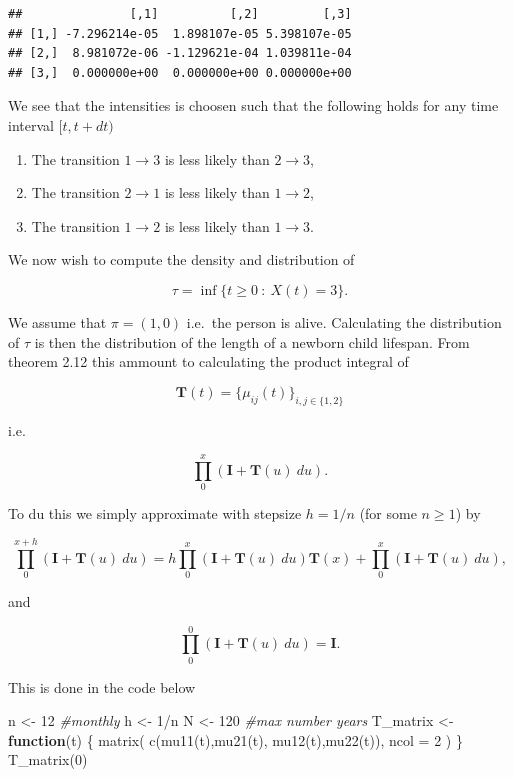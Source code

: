 \documentclass[
]{book}
\newenvironment{Shaded}{\begin{snugshade}}{\end{snugshade}}
\newcommand{\AttributeTok}[1]{\textcolor[rgb]{0.77,0.63,0.00}{#1}}
\newcommand{\CommentTok}[1]{\textcolor[rgb]{0.56,0.35,0.01}{\textit{#1}}}
\newcommand{\ControlFlowTok}[1]{\textcolor[rgb]{0.13,0.29,0.53}{\textbf{#1}}}
\newcommand{\DecValTok}[1]{\textcolor[rgb]{0.00,0.00,0.81}{#1}}
\newcommand{\FunctionTok}[1]{\textcolor[rgb]{0.00,0.00,0.00}{#1}}
\newcommand{\NormalTok}[1]{#1}
\newcommand{\OtherTok}[1]{\textcolor[rgb]{0.56,0.35,0.01}{#1}}
\newcommand{\SpecialCharTok}[1]{\textcolor[rgb]{0.00,0.00,0.00}{#1}}
\providecommand{\tightlist}{%
  \setlength{\itemsep}{0pt}\setlength{\parskip}{0pt}}
\begin{document}
\begin{verbatim}
##               [,1]          [,2]         [,3]
## [1,] -7.296214e-05  1.898107e-05 5.398107e-05
## [2,]  8.981072e-06 -1.129621e-04 1.039811e-04
## [3,]  0.000000e+00  0.000000e+00 0.000000e+00
\end{verbatim}

We see that the intensities is choosen such that the following holds for any time interval \([t,t+dt)\)

\begin{enumerate}
\def\labelenumi{\arabic{enumi}.}
\tightlist
\item
  The transition \(1\to 3\) is less likely than \(2\to 3\),
\item
  The transition \(2\to 1\) is less likely than \(1\to 2\),
\item
  The transition \(1\to 2\) is less likely than \(1\to 3\).
\end{enumerate}

We now wish to compute the density and distribution of

\[
\tau =\inf\{t\ge 0\ :\ X(t)=3\}.
\]

We assume that \(\pi=(1,0)\) i.e.~the person is alive. Calculating the distribution of \(\tau\) is then the distribution of the length of a newborn child lifespan. From theorem 2.12 this ammount to calculating the product integral of

\[
\mathbf{T}(t)=\{\mu_{ij}(t)\}_{i,j\in \{1,2\}}
\]

i.e.~

\[
\prod_0^x(\mathbf{I}+\mathbf{T}(u)\ du).
\]

To du this we simply approximate with stepsize \(h=1/n\) (for some \(n\ge 1\)) by

\[
\prod_0^{x+h}(\mathbf{I}+\mathbf{T}(u)\ du)=h\prod_0^x(\mathbf{I}+\mathbf{T}(u)\ du)\mathbf{T}(x)+\prod_0^x(\mathbf{I}+\mathbf{T}(u)\ du),
\]

and

\[
\prod_0^0(\mathbf{I}+\mathbf{T}(u)\ du)=\mathbf{I}.
\]

This is done in the code below

\begin{Shaded}
\begin{Highlighting}[]
\NormalTok{n }\OtherTok{\textless{}{-}} \DecValTok{12} \CommentTok{\#monthly}
\NormalTok{h }\OtherTok{\textless{}{-}} \DecValTok{1}\SpecialCharTok{/}\NormalTok{n}
\NormalTok{N }\OtherTok{\textless{}{-}} \DecValTok{120} \CommentTok{\#max number years}
\NormalTok{T\_matrix }\OtherTok{\textless{}{-}} \ControlFlowTok{function}\NormalTok{(t) \{}
  \FunctionTok{matrix}\NormalTok{(}
    \FunctionTok{c}\NormalTok{(}\FunctionTok{mu11}\NormalTok{(t),}\FunctionTok{mu21}\NormalTok{(t),}
      \FunctionTok{mu12}\NormalTok{(t),}\FunctionTok{mu22}\NormalTok{(t)),}
    \AttributeTok{ncol =} \DecValTok{2}
\NormalTok{  )}
\NormalTok{\}}
\FunctionTok{T\_matrix}\NormalTok{(}\DecValTok{0}\NormalTok{)}
\end{Highlighting}
\end{Shaded}
\end{document}
